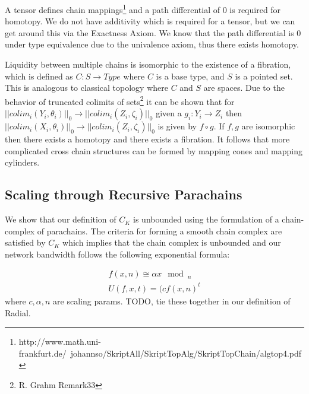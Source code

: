 \documentclass{article}
\begin{document}
A tensor defines chain mappings\footnote{http://www.math.uni-frankfurt.de/~johannso/SkriptAll/SkriptTopAlg/SkriptTopChain/algtop4.pdf} and a path differential of 0 is required for homotopy. We do not have additivity which is required for a tensor, but we can get around this via the Exactness Axiom. We know that the path differential is 0 under type equivalence due to the univalence axiom, thus there exists homotopy.

Liquidity between multiple chains is isomorphic to the existence of a fibration, which is defined as $C: S \rightarrow Type$ where $C$ is a base type, and $S$ is a pointed set. This is analogous to classical topology where $C$ and $S$ are spaces. Due to the behavior of truncated colimits of sets\footnote{R. Grahm Remark33} it can be shown that for $ || colim_i (Y_i,\theta_i) ||_0 \rightarrow || colim_i (Z_i,\zeta_i) ||_0$ given a $g_i: Y_i  \rightarrow Z_i$ then $|| colim_i (X_i,\theta_i) ||_0 \rightarrow || colim_i (Z_i,\zeta_i) ||_0$ is given by $f \circ g$. If $f,g$ are isomorphic then there exists a homotopy and there exists a fibration. It follows that more complicated cross chain structures can be formed by mapping cones and mapping cylinders.

\subsection{Scaling through Recursive Parachains}
We show that our definition of $C_K$ is unbounded using the formulation of a chain-complex of parachains. The criteria for forming a smooth chain complex are satisfied by $C_K$ which implies that the chain complex is unbounded and our network bandwidth follows the following exponential formula:

\begin{equation} \label{eq1}
\begin{split}
f(x, n) \cong \alpha x \mod_n \\
U(f, x, t) = (c f(x, n)^t
\end{split}
\end{equation}
where $c, \alpha, n$ are scaling params. TODO, tie these together in our definition of Radial.


\end{document}
